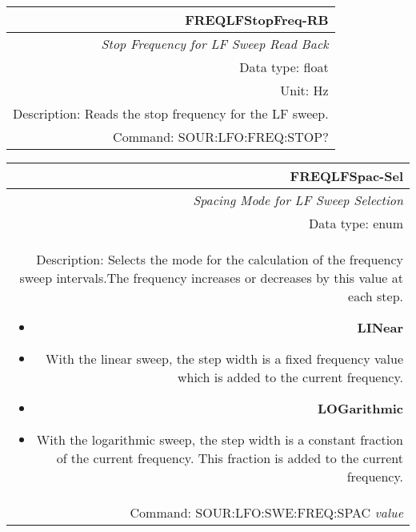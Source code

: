 \documentclass[openany]{article}
\begin{document}
		\begin{tabular}{N}
			\hline
			\bfseries FREQLFStopFreq-RB \\ \hline
			\emph{Stop Frequency for LF Sweep Read Back} \\
			Data type: float \\
			Unit: Hz \\
			Description: Reads the stop frequency for the LF sweep. \\
			Command: SOUR:LFO:FREQ:STOP? \\

		\end{tabular}
%
		\begin{tabular}{N}
			\hline
			\bfseries FREQLFSpac-Sel \\ \hline
			\emph{Spacing Mode for LF Sweep Selection} \\
			Data type: enum \\ 
			Description: Selects the mode for the calculation of the frequency sweep intervals.The frequency increases or decreases by this value at each step.\begin{itemize}[noitemsep]
				\small
				\item[] \textbf{LINear} 
				\item[] With the linear sweep, the step width is a fixed frequency value which is added to the current frequency.
				\item[] \textbf{LOGarithmic}
				\item[] With the logarithmic sweep, the step width is a constant fraction of the current frequency. This fraction is added to the current frequency.
			\end{itemize} \\
			Command: SOUR:LFO:SWE:FREQ:SPAC \emph{value} \\

		\end{tabular}
\end{document}
